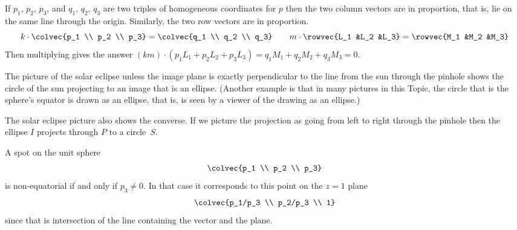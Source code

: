 \begin{ans}{4}
      If $p_1$, $p_2$, $p_3$, and $q_1$, $q_2$, $q_3$ are two triples of
      homogeneous coordinates for $p$ then the two column vectors
      are in proportion, that is, lie on the same line through the
      origin.
      Similarly, the two row vectors are in proportion.
      \begin{equation*}
        k\cdot\colvec{p_1 \\ p_2 \\ p_3}
          =\colvec{q_1 \\ q_2 \\ q_3}
        \qquad
        m\cdot\rowvec{L_1 &L_2 &L_3}
          =\rowvec{M_1 &M_2 &M_3}
      \end{equation*}
      Then multiplying gives the answer
      $(km)\cdot (p_1L_1+p_2L_2+p_3L_3)=q_1M_1+q_2M_2+q_3M_3=0$.
    
\end{ans}
\begin{ans}{5}
      The picture of the solar eclipse \Dash  unless
      the image plane is exactly perpendicular
      to the line from the sun through the pinhole \Dash  shows the circle
      of the sun projecting to an image that is an  ellipse.
      (Another example is that in many pictures in this
      Topic, the circle that is the sphere's equator is drawn as an ellipse,
      that is, is seen by a viewer of the drawing as an ellipse.)

      The solar eclipse picture also shows the converse.
      If we picture the projection as going from left to right
      through the pinhole
      then the ellipse $I$ projects through $P$ to a circle~$S$.
    
\end{ans}
\begin{ans}{6}
      A spot on the unit sphere
      \begin{equation*}
        \colvec{p_1 \\ p_2 \\ p_3}
      \end{equation*}
      is non-equatorial if and only if $p_3\neq 0$.
      In that case it corresponds to this point on the $z=1$ plane
      \begin{equation*}
        \colvec{p_1/p_3 \\ p_2/p_3  \\ 1}
      \end{equation*}
      since that is intersection of the line containing the vector and the
      plane.
    
\end{ans}
